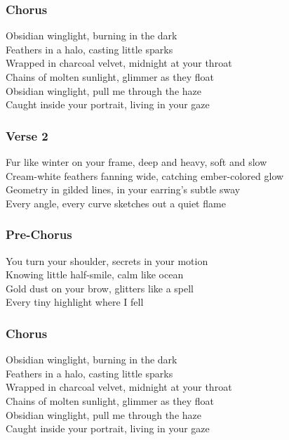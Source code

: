 \subsubsection{Chorus}\label{chorus-12}

Obsidian winglight, burning in the dark\\
Feathers in a halo, casting little sparks\\
Wrapped in charcoal velvet, midnight at your throat\\
Chains of molten sunlight, glimmer as they float\\
Obsidian winglight, pull me through the haze\\
Caught inside your portrait, living in your gaze

\subsubsection{Verse 2}\label{verse-2-6}

Fur like winter on your frame, deep and heavy, soft and slow\\
Cream-white feathers fanning wide, catching ember-colored glow\\
Geometry in gilded lines, in your earring's subtle sway\\
Every angle, every curve sketches out a quiet flame

\subsubsection{Pre-Chorus}\label{pre-chorus-5}

You turn your shoulder, secrets in your motion\\
Knowing little half-smile, calm like ocean\\
Gold dust on your brow, glitters like a spell\\
Every tiny highlight where I fell

\subsubsection{Chorus}\label{chorus-13}

Obsidian winglight, burning in the dark\\
Feathers in a halo, casting little sparks\\
Wrapped in charcoal velvet, midnight at your throat\\
Chains of molten sunlight, glimmer as they float\\
Obsidian winglight, pull me through the haze\\
Caught inside your portrait, living in your gaze

